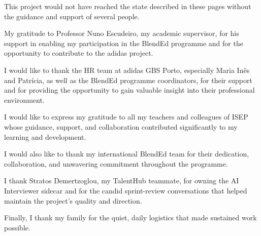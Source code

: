 \begin{abstract}
The resulting platform replaces ad-hoc spreadsheets with a structured,
analytics-ready talent pool, makes CV-derived data reusable across openings,
and introduces a reproducible CEFR-based language verification flow. The project also
yielded a reusable architectural reference for AI-assisted recruitment tools
that respect GDPR retention constraints.

\textbf{Keywords (Theme):} Recruitment, Talent Pool, Human Resources Tooling,
GDPR, Language Assessment.

\textbf{Keywords (Technologies):} Next.js, TypeScript, Supabase, Large
Language Models, Structured-Output Prompting, FastAPI.

\end{abstract}

\begin{acknowledgements}

This project would not have reached the state described in these pages
without the guidance and support of several people.

My gratitude to Professor Nuno Escudeiro, my academic supervisor, for his
support in enabling my participation in the BlendEd programme and for the
opportunity to contribute to the adidas project.

I would like to thank the HR team at adidas GBS Porto, especially Maria In\^es
and Patr\'icia, as well as the BlendEd programme coordinators, for their
support and for providing the opportunity to gain valuable insight into their
professional environment.

I would like to express my gratitude to all my teachers and colleagues of
ISEP whose guidance, support, and collaboration contributed significantly to
my learning and development.

I would also like to thank my international BlendEd team for their dedication,
collaboration, and unwavering commitment throughout the programme.

I thank Stratos Demertzoglou, my TalentHub teammate, for owning the AI
Interviewer sidecar and for the candid sprint-review conversations that
helped maintain the project's quality and direction.

Finally, I thank my family for the quiet, daily logistics that made
sustained work possible.

\end{acknowledgements}

